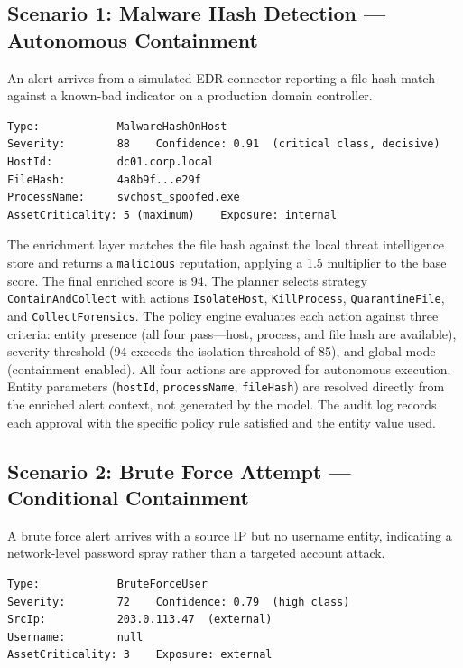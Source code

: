 \subsection{Scenario 1: Malware Hash Detection --- Autonomous Containment}

An alert arrives from a simulated EDR connector reporting a file hash match against a known-bad indicator on a production domain controller.

\begin{verbatim}
Type:            MalwareHashOnHost
Severity:        88    Confidence: 0.91  (critical class, decisive)
HostId:          dc01.corp.local
FileHash:        4a8b9f...e29f
ProcessName:     svchost_spoofed.exe
AssetCriticality: 5 (maximum)    Exposure: internal
\end{verbatim}

The enrichment layer matches the file hash against the local threat intelligence store and returns a \texttt{malicious} reputation, applying a 1.5 multiplier to the base score. The final enriched score is 94. The planner selects strategy \texttt{ContainAndCollect} with actions \texttt{IsolateHost}, \texttt{KillProcess}, \texttt{QuarantineFile}, and \texttt{CollectForensics}. The policy engine evaluates each action against three criteria: entity presence (all four pass---host, process, and file hash are available), severity threshold (94 exceeds the isolation threshold of 85), and global mode (containment enabled). All four actions are approved for autonomous execution. Entity parameters (\texttt{hostId}, \texttt{processName}, \texttt{fileHash}) are resolved directly from the enriched alert context, not generated by the model. The audit log records each approval with the specific policy rule satisfied and the entity value used.

\subsection{Scenario 2: Brute Force Attempt --- Conditional Containment}

A brute force alert arrives with a source IP but no username entity, indicating a network-level password spray rather than a targeted account attack.

\begin{verbatim}
Type:            BruteForceUser
Severity:        72    Confidence: 0.79  (high class)
SrcIp:           203.0.113.47  (external)
Username:        null
AssetCriticality: 3    Exposure: external
\end{verbatim}

